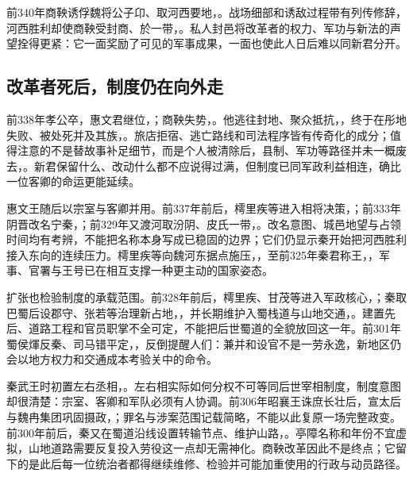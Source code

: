 前340年商鞅诱俘魏将公子卬、取河西要地，。战场细部和诱敌过程带有列传修辞，河西胜利却使商鞅受封商、於一带，。私人封邑将改革者的权力、军功与新法的声望拴得更紧：它一面奖励了可见的军事成果，一面也使此人日后难以同新君分开。

\subsection{改革者死后，制度仍在向外走}

前338年孝公卒，惠文君继位，；商鞅失势，。他逃往封地、聚众抵抗，，终于在彤地失败、被处死并及其族，。旅店拒宿、逃亡路线和司法程序皆有传奇化的成分；值得注意的不是替故事补足细节，而是个人被清除后，县制、军功等路径并未一概废去，。新君保留什么、改动什么都不应说得过满，但制度已同军政利益相连，确比一位客卿的命运更能延续。

惠文王随后以宗室与客卿并用。前337年前后，樗里疾等进入相将决策，；前333年阴晋改名宁秦，；前329年又渡河取汾阴、皮氏一带，。改名意图、城邑地望与占领时间均有考辨，不能把名称本身写成已稳固的边界；它们仍显示秦开始把河西胜利接入东向的连续压力。樗里疾等向魏河东据点施压，，至前325年秦君称王，，军事、官署与王号已在相互支撑一种更主动的国家姿态。

扩张也检验制度的承载范围。前328年前后，樗里疾、甘茂等进入军政核心，；秦取巴蜀后设郡守、张若等治理新占地，，并长期维护入蜀栈道与山地交通，。建置先后、道路工程和官员职掌不全可定，不能把后世蜀道的全貌放回这一年。前301年蜀侯煇反秦、司马错平定，，反倒提醒人们：兼并和设官不是一劳永逸，新地区仍会以地方权力和交通成本考验关中的命令。

秦武王时初置左右丞相，。左右相实际如何分权不可等同后世宰相制度，制度意图却很清楚：宗室、客卿和军队必须有人协调。前306年昭襄王诛庶长壮后，宣太后与魏冉集团巩固摄政，；罪名与涉案范围记载简略，不能以此复原一场完整政变。前300年前后，秦又在蜀道沿线设置转输节点、维护山路，。亭障名称和年份不宜虚拟，山地道路需要反复投入劳役这一点却无需神化。商鞅改革因此不是终点；它留下的是此后每一位统治者都得继续维修、检验并可能加重使用的行政与动员路径。

